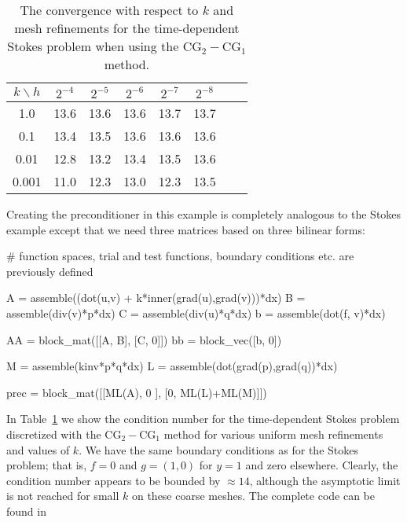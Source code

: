 \begin{table}
\begin{center}
\begin{tabular}{|c||c|c|c|c|c|c|c|}
\hline
$k\backslash h$ & $2^{-4}$ & $2^{-5}$ & $2^{-6}$ & $2^{-7}$ & $2^{-8}$ \\ \hline\hline
1.0 & 13.6 & 13.6 & 13.6 & 13.7 & 13.7 \\ \hline
0.1 & 13.4 & 13.5 & 13.6 & 13.6 & 13.6 \\ \hline
0.01 & 12.8 & 13.2 & 13.4 & 13.5 & 13.6 \\ \hline
0.001 & 11.0 & 12.3 & 13.0 & 12.3  & 13.5 \\ \hline
\end{tabular}
\caption{The convergence with respect to $k$ and mesh refinements for the time-dependent Stokes problem
when using the $\mathrm{CG}_2-\mathrm{CG}_1$ method.}\label{timestokes:ex}
\end{center}
\end{table}

Creating the preconditioner in this example is completely analogous to
the Stokes example except that we need three matrices based on three
bilinear forms:
\begin{python}

# function spaces, trial and test functions, boundary conditions etc. are previously defined

A = assemble((dot(u,v) + k*inner(grad(u),grad(v)))*dx)
B = assemble(div(v)*p*dx)
C = assemble(div(u)*q*dx)
b = assemble(dot(f, v)*dx)

AA = block_mat([[A, B],
                [C, 0]])
bb = block_vec([b, 0])

M = assemble(kinv*p*q*dx)
L = assemble(dot(grad(p),grad(q))*dx)

prec = block_mat([[ML(A),      0     ],
                  [0,     ML(L)+ML(M)]])
\end{python}
In Table~\ref{timestokes:ex} we show the condition number for the
time-dependent Stokes problem discretized with the
$\mathrm{CG}_2-\mathrm{CG}_1$ method for various uniform mesh refinements and
values of $k$. We have the same boundary conditions as for the Stokes
problem; that is, $f=0$ and $g = (1,0)$ for $y=1$ and zero elsewhere.
Clearly, the condition number appears to be bounded by $\approx 14$,
although the asymptotic limit is not reached for small $k$ on these
coarse meshes.  The complete code can be found in 

